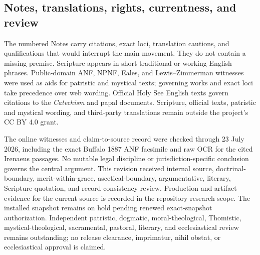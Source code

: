 \subsection{Notes, translations, rights, currentness, and review}

The numbered Notes carry citations, exact loci, translation cautions, and qualifications that would interrupt the main movement. They do not contain a missing premise. Scripture appears in short traditional or working-English phrases. Public-domain ANF, NPNF, Eales, and Lewis--Zimmerman witnesses were used as aids for patristic and mystical texts; governing works and exact loci take precedence over web wording. Official Holy See English texts govern citations to the \emph{Catechism} and papal documents. Scripture, official texts, patristic and mystical wording, and third-party translations remain outside the project's CC BY 4.0 grant.

The online witnesses and claim-to-source record were checked through 23 July 2026, including the exact Buffalo 1887 ANF facsimile and raw OCR for the cited Irenaeus passages. No mutable legal discipline or jurisdiction-specific conclusion governs the central argument. This revision received internal source, doctrinal-boundary, merit-within-grace, ascetical-boundary, argumentative, literary, Scripture-quotation, and record-consistency review. Production and artifact evidence for the current source is recorded in the repository research scope. The installed snapshot remains on hold pending renewed exact-snapshot authorization. Independent patristic, dogmatic, moral-theological, Thomistic, mystical-theological, sacramental, pastoral, literary, and ecclesiastical review remains outstanding; no release clearance, imprimatur, nihil obstat, or ecclesiastical approval is claimed.
